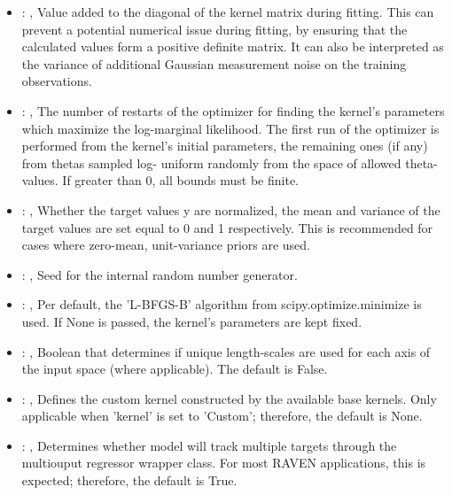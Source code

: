\begin{itemize}
    \item {}: , 
      Value added to the diagonal of the kernel matrix during fitting. This can prevent a potential
      numerical issue during fitting, by ensuring that the calculated
      values form a positive definite matrix. It can also be interpreted as the variance of
      additional Gaussian measurement noise on the training observations.

    \item {}: , 
      The number of restarts of the optimizer for finding the kernel's parameters which maximize the
      log-marginal likelihood. The first run of the optimizer is performed
      from the kernel's initial parameters, the remaining ones (if any) from thetas sampled log-
      uniform randomly from the space of allowed theta-values. If greater than
      0, all bounds must be finite.

    \item {}: , 
      Whether the target values y are normalized, the mean and variance of the target values are set
      equal to 0 and 1 respectively. This is recommended for cases where zero-mean,
      unit-variance priors are used.

    \item {}: , 
      Seed for the internal random number generator.

    \item {}: , 
      Per default, the 'L-BFGS-B' algorithm from
      scipy.optimize.minimize is used. If None is passed, the kernel’s
      parameters are kept fixed.

    \item {}: , 
      Boolean that determines if unique length-scales are used for each
      axis of the input space (where applicable). The default is False.

    \item {}: , 
      Defines the custom kernel constructed by the available base kernels.
      Only applicable when 'kernel' is set to 'Custom'; therefore, the default is None.

    \item {}: , 
      Determines whether model will track multiple targets through the
      multiouput regressor wrapper class. For most RAVEN applications, this is expected;
      therefore, the default is True.
  \end{itemize}



